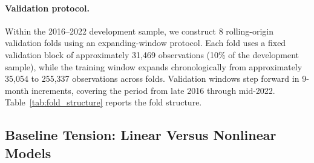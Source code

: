\documentclass[12pt]{article}
\theoremstyle{plain}
\theoremstyle{definition}
\newcommand{\1}{\mathbf{1}}
\begin{document}
\paragraph{Validation protocol.} Within the 2016--2022 development sample, we construct 8 rolling-origin validation folds using an expanding-window protocol. Each fold uses a fixed validation block of approximately 31{,}469 observations (10\% of the development sample), while the training window expands chronologically from approximately 35{,}054 to 255{,}337 observations across folds. Validation windows step forward in 9-month increments, covering the period from late 2016 through mid-2022. Table~\ref{tab:fold_structure} reports the fold structure.

\begin{table}[!ht]
\centering
\caption{Rolling-origin validation fold structure. Training windows expand chronologically; validation blocks are of fixed size.}
\label{tab:fold_structure}
\end{table}

\subsection{Baseline Tension: Linear Versus Nonlinear Models}
\end{document}
